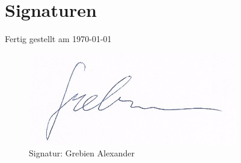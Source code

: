 \chapter{Signaturen}
    Fertig gestellt am \today \\
    \begin{figure}[H]
        \centering
        \includegraphics{pics/signature_grebien.png}
    	\caption{Signatur: Grebien Alexander}
    	\label{pic:signatur_grebien}
    \end{figure}
        
\listoffigures
\listoftables


